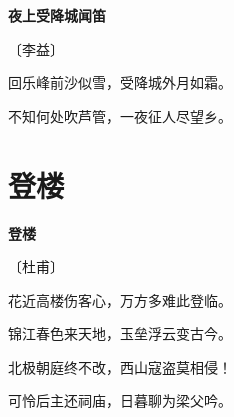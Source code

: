 \documentclass[12pt,UTF-8,openany,fontset=none]{ctexbook}
\begin{document}

\begin{center}
    {\bfseries 夜上受降城闻笛}

    \vspace{18pt}

    \begin{large}\xuwen
        〔李益〕
    \end{large}

\end{center}

    \vspace{18pt}

\begin{center}
    \begin{Large}

        回乐峰前沙似雪，受降城外月如霜。

        不知何处吹芦管，一夜征人尽望乡。

    \end{Large}

\end{center}

\vspace{8pt}
\clearpage

\section{登楼}


\begin{center}
    {\bfseries 登楼}

    \vspace{18pt}

    \begin{large}\xuwen
        〔杜甫〕
    \end{large}

\end{center}

    \vspace{18pt}

\begin{center}
    \begin{Large}

        花近高楼伤客心，万方多难此登临。

        锦江春色来天地，玉垒浮云变古今。

        北极朝庭终不改，西山寇盗莫相侵！

        可怜后主还祠庙，日暮聊为梁父吟。

    \end{Large}

\end{center}
\end{document}
